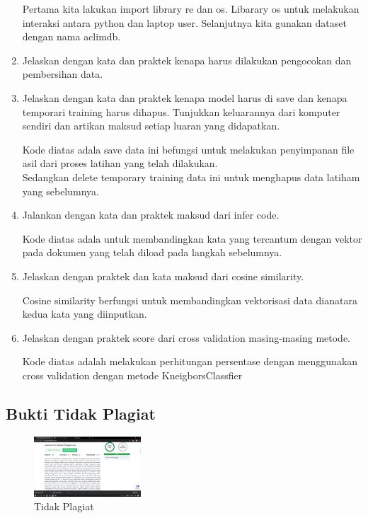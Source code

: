 \begin{enumerate}
	\hfill\break
	

Pertama kita lakukan import library re dan os. Libarary os untuk melakukan interaksi antara python dan laptop user. Selanjutnya kita gunakan dataset dengan nama aclimdb.

\item Jelaskan dengan kata dan praktek kenapa harus dilakukan pengocokan dan pembersihan data.

	\hfill\break
	

\item Jelaskan dengan kata dan praktek kenapa model harus di save dan kenapa temporari training harus dihapus. Tunjukkan keluarannya dari komputer sendiri dan artikan maksud setiap luaran yang didapatkan.

	\hfill\break
	

Kode diatas adala save data ini befungsi untuk melakukan penyimpanan file asil dari proses latihan yang telah dilakukan.\\
Sedangkan  delete temporary training data ini untuk menghapus data latiham yang sebelumnya.

\item Jalankan dengan kata dan praktek maksud dari infer code.

	\hfill\break
	
	
Kode diatas adala untuk membandingkan kata yang tercantum dengan vektor pada dokumen yang telah diload pada langkah sebelumnya.

\item Jelaskan dengan praktek dan kata maksud dari cosine similarity. 

	\hfill\break
	

Cosine similarity berfungsi untuk membandingkan vektorisasi data dianatara kedua kata yang diinputkan.

\item Jelaskan dengan praktek score dari cross validation masing-masing metode.

	\hfill\break
	

Kode diatas adalah melakukan perhitungan persentase dengan menggunakan cross validation dengan metode KneigborsClassfier
\end{enumerate}

\subsection{Bukti Tidak Plagiat}

\begin{figure}
	\includegraphics[width=4cm]{figures/1174062/5/tidakplagiat.png}
	\centering
	\caption{Tidak Plagiat}
\end{figure}

